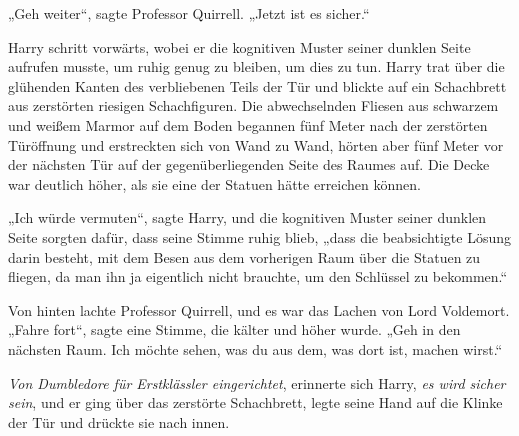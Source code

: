„Geh weiter“, sagte Professor Quirrell.
„Jetzt ist es sicher.“

Harry schritt vorwärts, wobei er die kognitiven Muster seiner dunklen Seite aufrufen musste, um ruhig genug zu bleiben, um dies zu tun. Harry trat über die glühenden Kanten des verbliebenen Teils der Tür und blickte auf ein Schachbrett aus zerstörten riesigen Schachfiguren. Die abwechselnden Fliesen aus schwarzem und weißem Marmor auf dem Boden begannen fünf Meter nach der zerstörten Türöffnung und erstreckten sich von Wand zu Wand, hörten aber fünf Meter vor der nächsten Tür auf der gegenüberliegenden Seite des Raumes auf. Die Decke war deutlich höher, als sie eine der Statuen hätte erreichen können.

„Ich würde vermuten“, sagte Harry, und die kognitiven Muster seiner dunklen Seite sorgten dafür, dass seine Stimme ruhig blieb, „dass die beabsichtigte Lösung darin besteht, mit dem Besen aus dem vorherigen Raum über die Statuen zu fliegen, da man ihn ja eigentlich nicht brauchte, um den Schlüssel zu bekommen.“

Von hinten lachte Professor Quirrell, und es war das Lachen von Lord Voldemort.
„Fahre fort“, sagte eine Stimme, die kälter und höher wurde.
„Geh in den nächsten Raum. Ich möchte sehen, was du aus dem, was dort ist, machen wirst.“

\emph{Von Dumbledore für Erstklässler eingerichtet}, erinnerte sich Harry, \emph{es \emph{wird} sicher sein}, und er ging über das zerstörte Schachbrett, legte seine Hand auf die Klinke der Tür und drückte sie nach innen.

